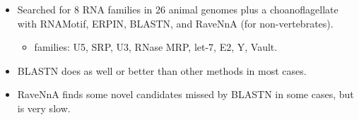 \documentclass[landscape]{slides}
\begin{document}
\begin{slide}
\vfill 
\end{slide}
\begin{slide}


\small
\begin{itemize}
\item Searched for 8 RNA families in 26 animal genomes plus
  a choanoflagellate with RNAMotif, ERPIN, BLASTN, and RaveNnA (for non-vertebrates).
\begin{itemize}
\item 
  families: U5, SRP, U3, RNase MRP, let-7, E2, Y, Vault.
\end{itemize}
\item BLASTN does as well or better than other methods in most cases.
\item RaveNnA finds some novel candidates missed by BLASTN in some
  cases, but is very slow.
\end{itemize}

\vfill 
\end{slide}
\begin{slide}



\end{slide}
\begin{slide}



\end{slide}
\begin{slide}



\end{slide}
\end{document}
